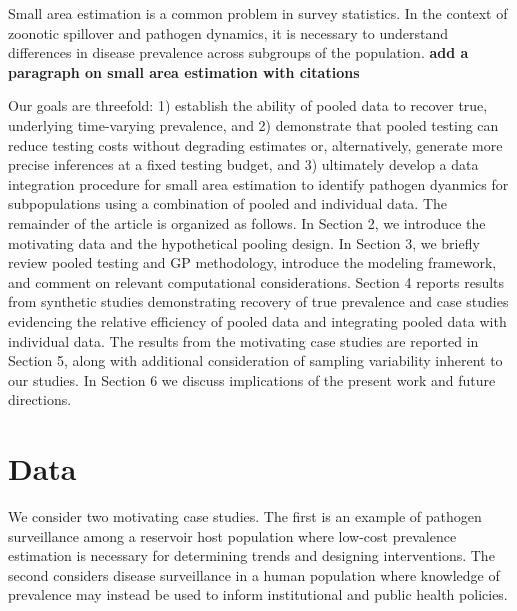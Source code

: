 \documentclass{article}
\begin{document}
Small area estimation is a common problem in survey statistics. In the context of zoonotic spillover and pathogen dynamics, it is necessary to understand differences in disease prevalence across subgroups of the population. {\bf add a paragraph on small area estimation with citations}

Our goals are threefold: 1) establish the ability of pooled data to recover true, underlying time-varying prevalence, and 2) demonstrate that pooled testing can reduce testing costs without degrading estimates or, alternatively, generate more precise inferences at a fixed testing budget, and 3) ultimately develop a data integration procedure for small area estimation to identify pathogen dyanmics for subpopulations using a combination of pooled and individual data. The remainder of the article is organized as follows. In Section 2, we introduce the motivating data and the hypothetical pooling design. In Section 3, we briefly review pooled testing and GP methodology, introduce the modeling framework, and comment on relevant computational considerations. Section 4 reports results from synthetic studies demonstrating recovery of true prevalence and case studies evidencing the relative efficiency of pooled data and integrating pooled data with individual data. The results from the motivating case studies are reported in Section 5, along with additional consideration of sampling variability inherent to our studies. In Section 6 we discuss implications of the present work and future directions.  

\section{Data}

We consider two motivating case studies. The first is an example of pathogen surveillance among a reservoir host population where low-cost prevalence estimation is necessary for determining trends and designing interventions. The second considers disease surveillance in a human population where knowledge of prevalence may instead be used to inform institutional and public health policies.  
\end{document}
